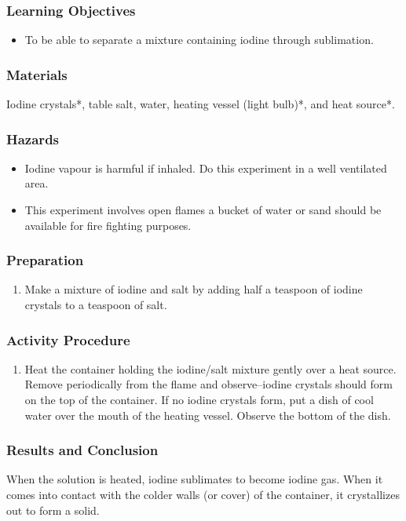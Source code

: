 \subsubsection*{Learning Objectives}
\begin{itemize}
\item{To be able to separate a mixture containing iodine through sublimation.}
\end{itemize}

\subsubsection*{Materials}
Iodine crystals*, table salt, water, heating vessel (light bulb)*, and heat source*.
\subsubsection*{Hazards}
\begin{itemize}
\item Iodine vapour is harmful if inhaled. Do this experiment in a well ventilated area.
\item This experiment involves open flames a bucket of water or sand should be available for fire fighting purposes.
\end{itemize}

\subsubsection*{Preparation}
\begin{enumerate}
\item{Make a mixture of iodine and salt by adding half a teaspoon of iodine crystals to a teaspoon of salt.}
\end{enumerate}

\subsubsection*{Activity Procedure}
\begin{enumerate}
\item{Heat the container holding the iodine/salt mixture gently over a heat source. Remove periodically from the flame and observe--iodine crystals should form on the top of the container. If no iodine crystals form, put a dish of cool water over the mouth of the heating vessel. Observe the bottom of the dish. }
\end{enumerate}

\subsubsection*{Results and Conclusion}
When the solution is heated, iodine sublimates to become iodine gas. When it comes into contact with the colder walls (or cover) of the container, it crystallizes out to form a solid.

